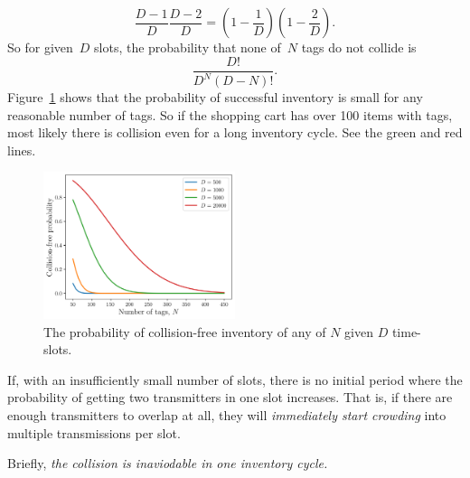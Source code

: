 \documentclass[12pt]{article}
\begin{document}
\[
\frac{D-1}{D} \frac{D-2}{D} = \left(1-\frac{1}{D}\right) \left(1- \frac{2}{D}\right).
\] 
So for given~$D$ slots,  the probability that none of~$N$ tags do not collide is
\[
\frac{D!}{D^N(D-N)!}.
\] 
Figure~\ref{fig:pr_collision-free} shows that the probability of successful inventory is small for any reasonable number of tags. So if the shopping cart has over 100 items with tags, most likely there is collision even for a long inventory cycle. See the green and red lines. 
\begin{figure}[!tb]
\centering
\includegraphics[width=0.5\textwidth]{fig_collision_free}
\caption{The probability of collision-free inventory of any of $N$ given $D$ time-slots.}
\label{fig:pr_collision-free}
\end{figure}

If, with an insufficiently small number of slots, there is no initial period where the probability of getting two transmitters in one slot increases. That is, if there are enough transmitters to overlap at all, they will \emph{immediately start crowding} into multiple transmissions per slot.

Briefly, \emph{the collision is inaviodable in one inventory cycle.}
\end{document}
